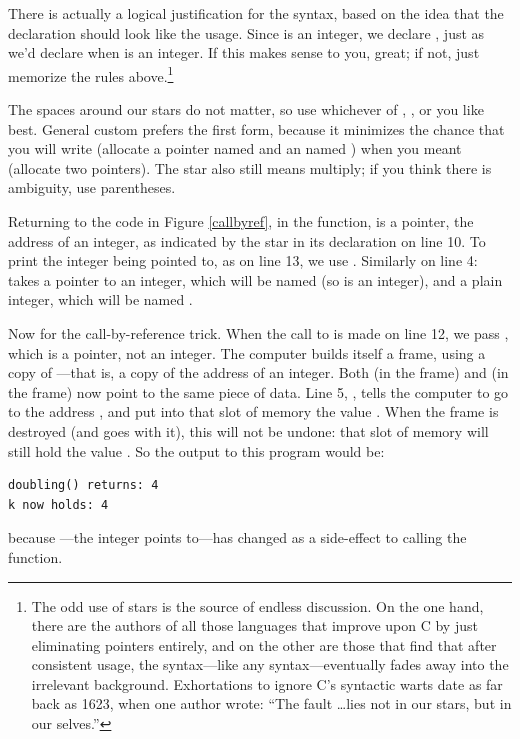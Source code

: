 \documentclass[12pt]{article}
\begin{document}
There is actually a
logical justification for the syntax, based on the
idea that the declaration should look like
the usage. Since  is an integer, we declare ,
just as we'd declare  when  is an integer.
If this makes sense to you, great; if not, just memorize the rules 
above.\footnote{The
odd use of stars is the source of endless discussion. On the one hand,
there are the authors of all those languages that improve upon C by
just eliminating pointers entirely, and on the other are those that find
that after consistent usage, the syntax---like any syntax---eventually
fades away into the irrelevant background.  Exhortations to ignore
C's syntactic warts date as far back as 1623, when one author wrote:
``The fault \dots lies not in our stars, but in our
selves.''}

The spaces around our stars do not matter, so use whichever of , , or  you like best. General
custom prefers the first form, because it minimizes the chance that you
will write  (allocate a pointer named 
and an  named ) when you meant  (allocate two pointers). The star also
still means multiply; if you think there is ambiguity, use parentheses.

Returning to the code in Figure \ref{callbyref}, in the 
function,  is a pointer, the address of an integer, as
indicated by the star in its declaration on line 10. To print the integer
being pointed to, as on line 13, we use .
Similarly on line 4:  takes a pointer to an integer,
which will be named  (so  is an integer),
and a plain integer, which will be named
.

Now for the call-by-reference trick.  When the call to 
is made on line 12, we pass , which is a pointer, not
an integer. The computer builds itself a frame, using a copy of
---that is, a copy of the address of an integer. Both
 (in the  frame) and  (in the
 frame) now point to the same piece of data.  Line 5,
, tells the computer to go to the address
, and put into that slot of memory the value . When the frame is destroyed (and  goes with it),
this will not be undone: that slot of memory will still hold the value
.  So the output to this program would be: 
\begin{lstlisting}
doubling() returns: 4
k now holds: 4
\end{lstlisting}
because ---the integer  points to---has changed as a
side-effect to calling the  function.
\end{document}
